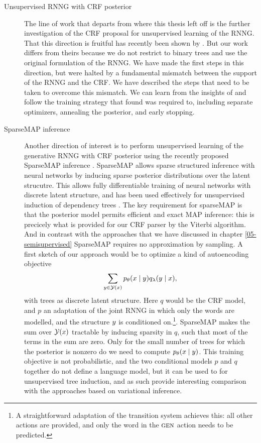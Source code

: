   \begin{description}
    \item[Unsupervised RNNG with CRF posterior]
      The line of work that departs from where this thesis left off is the further investigation of the CRF proposal for unsupervised learning of the RNNG. That this direction is fruitful has recently been shown by \citet{kim2019unsupervised}. But our work differs from theirs because we do not restrict to binary trees and use the original formulation of the RNNG. We have made the first steps in this direction, but were halted by a fundamental mismatch between the support of the RNNG and the CRF. We have described the steps that need to be taken to overcome this mismatch. We can learn from the insights of \cite{kim2019unsupervised} and follow the training strategy that found was required to, including separate optimizers, annealing the posterior, and early stopping.

    \item[SparseMAP inference]
      Another direction of interest is to perform unsupervised learning of the generative RNNG with CRF posterior using the recently proposed SparseMAP inference \citep{niculae2018sparsemap}. SparseMAP allows sparse structured inference with neural networks by inducing sparse posterior distributions over the latent strucutre. This allows fully differentiable training of neural networks with discrete latent structure, and has been used effectively for unsupervised induction of dependency trees \citep{niculae2018towards}. The key requirement for sparseMAP is that the posterior model permits efficient and exact MAP inference: this is precicely what is provided for our CRF parser by the Viterbi algorithm. And in contrast with the approaches that we have discussed in chapter \ref{05-semisupervised} SparseMAP requires no approximation by sampling. A first sketch of our approach would be to optimize a kind of autoencoding objective
      \begin{align*}
        \sum_{ y \in \mathcal{Y}(x) } p_{\theta}(x \mid y) q_{\lambda}( y \mid x ),
      \end{align*}
      with trees as discrete latent structure. Here $q$ would be the CRF model, and $p$ an adaptation of the joint RNNG in which only the words are modelled, and the structure $y$ is conditioned on.\footnote{A straightforward adaptation of the transition system achieves this: all other actions are provided, and only the word in the $\textsc{gen}$ action needs to be predicted.}. SparseMAP makes the sum over $\mathcal{Y}(x)$ tractable by inducing sparsity in $q$, such that most of the terms in the sum are zero. Only for the small number of trees for which the posterior is nonzero do we need to compute $p_{\theta}(x \mid y)$. This training objective is not probabilistic, and the two conditional models $p$ and $q$ together do not define a language model, but it can be used to for unsupervised tree induction, and as such provide interesting comparison with the approaches based on variational inference.

    \end{description}
